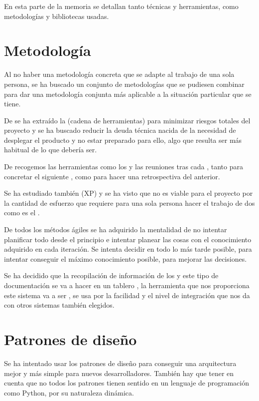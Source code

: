 
En esta parte de la memoria se detallan tanto técnicas y herramientas, como metodologías y bibliotecas usadas.


\section{Metodología}

Al no haber una metodología concreta que se adapte al trabajo de una sola persona, se ha buscado un conjunto de metodologías que se pudiesen combinar para dar una metodología conjunta más aplicable a la situación particular que se tiene. 

De  se ha extraído la  (cadena de herramientas) para minimizar riesgos totales del proyecto y se ha buscado reducir la deuda técnica nacida de la necesidad de desplegar el producto y no estar preparado para ello, algo que resulta ser más habitual de lo que debería ser.

De  recogemos las herramientas como los  y las reuniones tras cada , tanto para concretar el siguiente , como para hacer una retrospectiva del anterior. 

Se ha estudiado también  (XP) y se ha visto que no es viable para el proyecto por la cantidad de esfuerzo que requiere para una sola persona hacer el trabajo de dos como es el . 

De todos los métodos ágiles se ha adquirido la mentalidad de no intentar planificar todo desde el principio e intentar planear las cosas con el conocimiento adquirido en cada iteración. Se intenta decidir en todo lo más tarde posible, para intentar conseguir el máximo conocimiento posible, para mejorar las decisiones.

Se ha decidido que la recopilación de información de los  y este tipo de documentación se va a hacer en un tablero , la herramienta que nos proporciona este  sistema va a ser , se usa por la facilidad y el nivel de integración que nos da con otros sistemas también elegidos.


\section{Patrones de diseño}

Se ha intentado usar los patrones de diseño para conseguir una arquitectura mejor y más simple para nuevos desarrolladores. También hay que tener en cuenta que no todos los patrones tienen sentido en un lenguaje de programación como Python, por su naturaleza dinámica.

